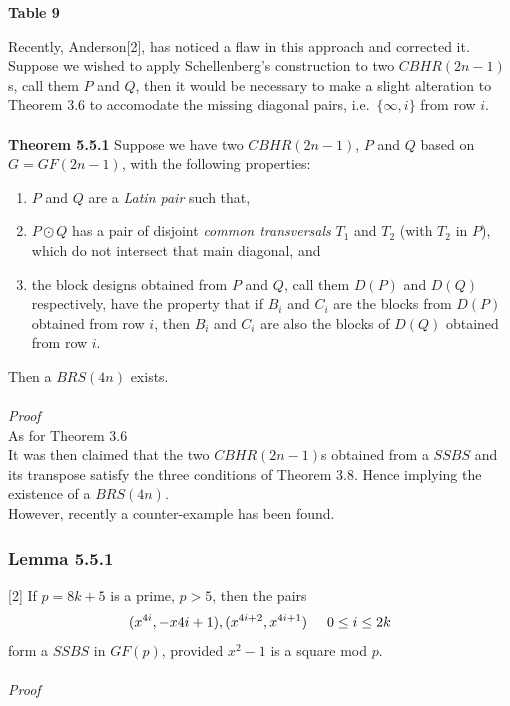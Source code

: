 \documentclass[
  11pt,
  a4paper]{book}
\begin{document}
\textbf{Table 9}

Recently, Anderson{[}2{]}, has noticed a flaw in this approach and corrected
it.\\
Suppose we wished to apply Schellenberg's construction to two
\(CBHR(2n-1)\)s, call them \(P\) and \(Q\), then it would be necessary to make
a slight alteration to Theorem 3.6 to accomodate the missing diagonal
pairs, i.e.~\(\{\infty,i\}\) from row \(i\).\\
~\\
\textbf{Theorem 5.5.1} Suppose we have two \(CBHR(2n-1)\), \(P\) and \(Q\) based on
\(G=GF(2n-1)\), with the following properties:

\begin{enumerate}
\def\labelenumi{\arabic{enumi}.}
\item
  \(P\) and \(Q\) are a \emph{Latin pair} such that,
\item
  \(P \odot Q\) has a pair of disjoint \emph{common transversals} \(T_1\) and
  \(T_2\) (with \(T_2\) in \(P\)), which do not intersect that main
  diagonal, and
\item
  the block designs obtained from \(P\) and \(Q\), call them \(D(P)\) and
  \(D(Q)\) respectively, have the property that if \(B_i\) and \(C_i\) are
  the blocks from \(D(P)\) obtained from row \(i\), then \(B_i\) and \(C_i\)
  are also the blocks of \(D(Q)\) obtained from row \(i\).
\end{enumerate}

Then a \(BRS(4n)\) exists.\\
~\\
\emph{Proof}\\
As for Theorem 3.6\\
It was then claimed that the two \(CBHR(2n-1)\)s obtained from a \(SSBS\)
and its transpose satisfy the three conditions of Theorem 3.8. Hence
implying the existence of a \(BRS(4n)\).\\
However, recently a counter-example has been found.

\hypertarget{lemma-5.5.1}{%
\subsubsection{Lemma 5.5.1}\label{lemma-5.5.1}}

{[}2{]} If \(p=8k+5\) is a prime, \(p > 5\), then the pairs
\[(x^{4i},-x{4i+1}),(x^{4i+2},x^{4i+1})\hspace{0.5cm} 0 \leq i \leq 2k\]
form a \(SSBS\) in \(GF(p)\), provided \(x^2-1\) is a square mod \(p\).\\
~\\
\emph{Proof}
\end{document}
